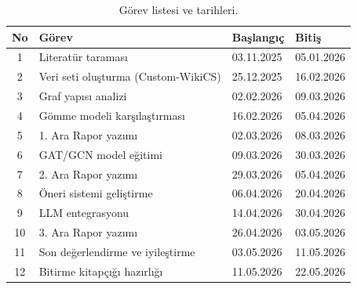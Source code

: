 \documentclass[12pt, a4paper]{article}
\begin{document}
\begin{table}[htbp]
\centering
\caption{Görev listesi ve tarihleri.}
\label{tab:gorevler}
\begin{tabular}{clll}
\toprule
\textbf{No} & \textbf{Görev} & \textbf{Başlangıç} & \textbf{Bitiş} \\
\midrule
1  & Literatür taraması                   & 03.11.2025 & 05.01.2026 \\
2  & Veri seti oluşturma (Custom-WikiCS)  & 25.12.2025 & 16.02.2026 \\
3  & Graf yapısı analizi                  & 02.02.2026 & 09.03.2026 \\
4  & Gömme modeli karşılaştırması         & 16.02.2026 & 05.04.2026 \\
5  & 1. Ara Rapor yazımı                  & 02.03.2026 & 08.03.2026 \\
\midrule
6  & GAT/GCN model eğitimi               & 09.03.2026 & 30.03.2026 \\
7  & 2. Ara Rapor yazımı                  & 29.03.2026 & 05.04.2026 \\
8  & Öneri sistemi geliştirme             & 06.04.2026 & 20.04.2026 \\
9  & LLM entegrasyonu                     & 14.04.2026 & 30.04.2026 \\
10 & 3. Ara Rapor yazımı                  & 26.04.2026 & 03.05.2026 \\
11 & Son değerlendirme ve iyileştirme     & 03.05.2026 & 11.05.2026 \\
12 & Bitirme kitapçığı hazırlığı          & 11.05.2026 & 22.05.2026 \\
\bottomrule
\end{tabular}
\end{table}
\end{document}
